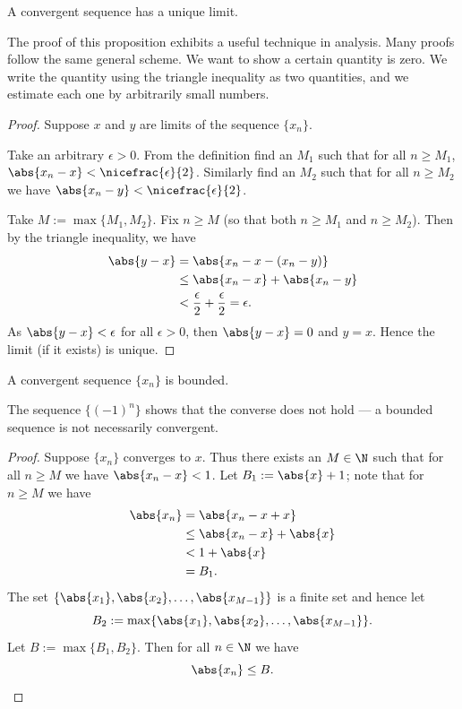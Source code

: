 \documentclass[12pt]{book}
\begin{document}
\begin{prop} \label{prop:limisunique}
A convergent sequence has a unique limit.
\end{prop}

The proof of this proposition exhibits a useful technique in
analysis.
Many proofs follow the same general scheme.
We want to show a certain quantity is zero.
We write the quantity using the triangle inequality as two quantities, and we estimate each one
by arbitrarily small numbers.

\begin{proof}
Suppose $x$ and $y$ are limits of the sequence $\{ x_n \}$.

Take an arbitrary $\epsilon > 0$.
From the definition find an $M_1$ such that for all $n \geq M_1$,
$\abs{x_n-x} < \nicefrac{\epsilon}{2}$.
Similarly find an $M_2$
such that for all $n \geq M_2$ we have
$\abs{x_n-y} < \nicefrac{\epsilon}{2}$.

Take $M := \max \{M_1, M_2\}$.
Fix $n \geq M$ (so that both $n \geq M_1$ and $n \geq M_2$).
Then by the triangle inequality, we have
\begin{equation*}
\begin{split}
\abs{y-x}
& =
\abs{x_n-x - (x_n -y)} \\
& \leq
\abs{x_n-x} + \abs{x_n -y} \\
& <
\frac{\epsilon}{2} + \frac{\epsilon}{2} = \epsilon .
\end{split}
\end{equation*}
As $\abs{y-x} < \epsilon$ for all $\epsilon > 0$, then $\abs{y-x} = 0$
and $y=x$.
Hence the limit (if it exists) is unique.
\end{proof}

\begin{prop}
A convergent sequence $\{ x_n \}$ is bounded.
\end{prop}

The sequence $\{ {(-1)}^n \}$ shows that the converse does not hold ---
a bounded sequence is not necessarily convergent.

\begin{proof}
Suppose $\{ x_n \}$ converges to $x$.
Thus there exists an $M \in \N$
such that for all $n \geq M$ we have
$\abs{x_n - x} < 1$.
Let $B_1 := \abs{x}+1$; 
note that for $n \geq M$ we have
\begin{equation*}
\begin{split}
\abs{x_n} & = \abs{x_n - x + x}
\\
& \leq \abs{x_n - x} + \abs{x}
\\
& < 1 + \abs{x} 
\\
&= B_1 .
\end{split}
\end{equation*}
The set $\{ \abs{x_1}, \abs{x_2}, \ldots, \abs{x_{M-1}} \}$
is a finite set and hence let
\begin{equation*}
B_2 := \max \{ \abs{x_1}, \abs{x_2}, \ldots, \abs{x_{M-1}} \} .
\end{equation*}
Let $B := \max \{ B_1, B_2 \}$.
Then for all $n \in \N$ we have
\begin{equation*}
\abs{x_n} \leq B. \qedhere
\end{equation*}
\end{proof}
\end{document}
